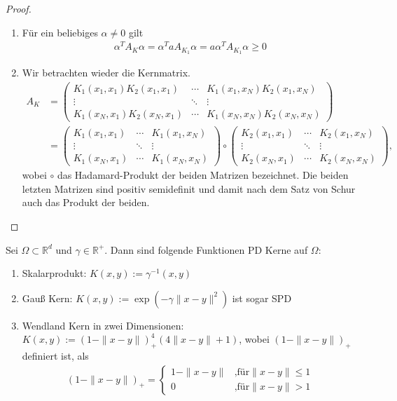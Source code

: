 \begin{proof}
\begin{enumerate}
\item
Für ein beliebiges $\alpha \neq 0$ gilt
\begin{align*}
\alpha^T A_K \alpha = \alpha^T a A_{K_1} \alpha = a \alpha^T A_{K_1} \alpha \geq 0
\end{align*}
\item
Wir betrachten wieder die Kernmatrix.
\begin{align*}
A_K &= 
\begin{pmatrix}
K_1(x_1,x_1)K_2(x_1, x_1) & \cdots & K_1(x_1,x_N)K_2(x_1, x_N) \\ 
\vdots & \ddots & \vdots \\ 
K_1(x_N,x_1)K_2(x_N, x_1) & \cdots & K_1(x_N,x_N)K_2(x_N, x_N)
\end{pmatrix} \\
&= 
\begin{pmatrix}
K_1(x_1,x_1) & \cdots & K_1(x_1,x_N) \\ 
\vdots & \ddots & \vdots \\ 
K_1(x_N,x_1) & \cdots & K_1(x_N,x_N)
\end{pmatrix}
\circ
\begin{pmatrix}
K_2(x_1, x_1) & \cdots & K_2(x_1, x_N) \\ 
\vdots & \ddots & \vdots \\ 
K_2(x_N, x_1) & \cdots & K_2(x_N, x_N)
\end{pmatrix},
\end{align*}
wobei $\circ$ das Hadamard-Produkt der beiden Matrizen bezeichnet. 
Die beiden letzten Matrizen sind positiv semidefinit und damit nach dem Satz von Schur \cite{.30.07.2018} auch das Produkt der beiden.
\end{enumerate}
\end{proof}

\begin{example}
\label{ex:Kern}
Sei $\Omega \subset \mathbb{R}^d$ und $\gamma \in \mathbb{R}^+$. Dann sind folgende Funktionen \ac{PD} Kerne auf $\Omega$:
\begin{enumerate}
\item Skalarprodukt: $K(x,y) := \gamma^{-1} (x,y)$
\item Gauß Kern: $K(x,y) := \exp\left(-\gamma \|x-y\|^2\right)$ ist sogar \ac{SPD}
\item Wendland Kern in zwei Dimensionen: $K(x,y) := (1- \|x-y\|)_+^4(4 \|x-y\| +1)$, wobei $(1-\|x-y\|)_+$ definiert ist, als
\begin{align*}
(1 - \|x-y\|)_+ =
\begin{cases}
1 - \|x-y\| & \text{,für} \|x-y\| \leq 1 \\
0 & \text{,für} \|x-y\| > 1
\end{cases}
\end{align*}
\end{enumerate}
\end{example}

